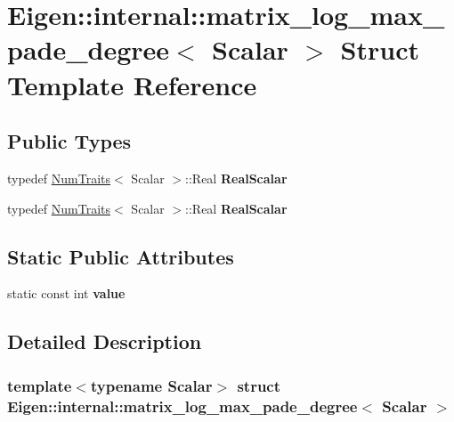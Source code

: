 \hypertarget{struct_eigen_1_1internal_1_1matrix__log__max__pade__degree}{}\section{Eigen\+:\+:internal\+:\+:matrix\+\_\+log\+\_\+max\+\_\+pade\+\_\+degree$<$ Scalar $>$ Struct Template Reference}
\label{struct_eigen_1_1internal_1_1matrix__log__max__pade__degree}
\subsection*{Public Types}
\begin{DoxyCompactItemize}
\item 
\mbox{\label{struct_eigen_1_1internal_1_1matrix__log__max__pade__degree_a4ae64629bcb2b71681bc28d91bfff9c1}} 
typedef \hyperlink{group___core___module_struct_eigen_1_1_num_traits}{Num\+Traits}$<$ Scalar $>$\+::Real {\bfseries Real\+Scalar}
\item 
\mbox{\label{struct_eigen_1_1internal_1_1matrix__log__max__pade__degree_a4ae64629bcb2b71681bc28d91bfff9c1}} 
typedef \hyperlink{group___core___module_struct_eigen_1_1_num_traits}{Num\+Traits}$<$ Scalar $>$\+::Real {\bfseries Real\+Scalar}
\end{DoxyCompactItemize}
\subsection*{Static Public Attributes}
\begin{DoxyCompactItemize}
\item 
static const int {\bfseries value}
\end{DoxyCompactItemize}


\subsection{Detailed Description}
\subsubsection*{template$<$typename Scalar$>$\newline
struct Eigen\+::internal\+::matrix\+\_\+log\+\_\+max\+\_\+pade\+\_\+degree$<$ Scalar $>$}



